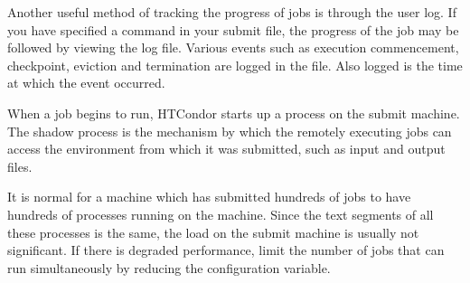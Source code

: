 Another useful method of tracking the progress of jobs is through the
user log.  If you have specified a  command in 
your submit file, the progress of the job may be followed by viewing the
log file.  Various events such as execution commencement, checkpoint, eviction 
and termination are logged in the file.
Also logged is the time at which the event occurred.

When a job begins to run, HTCondor starts up a  process
on the submit machine.  The shadow process is the mechanism by which the
remotely executing jobs can access the environment from which it was
submitted, such as input and output files.  

It is normal for a machine which has submitted hundreds of jobs to have 
hundreds of  processes running on the machine.
Since the text segments of all these processes is the same,
the load on the submit machine is usually not significant.
If there is degraded performance, limit 
the number of jobs that can run simultaneously by reducing the 
 configuration variable.

